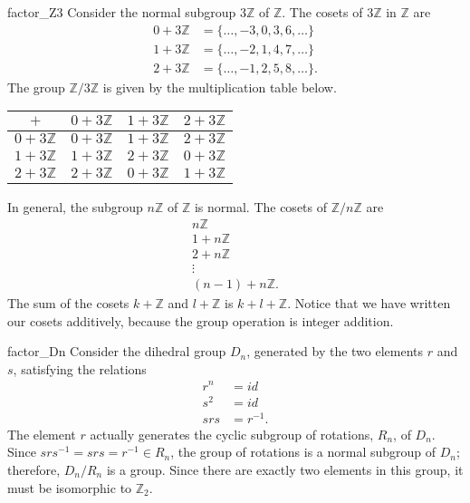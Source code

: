  
\begin{example}{factor_Z3}
Consider the normal subgroup $3 {\mathbb Z}$ of ${\mathbb Z}$. The cosets of
$3 {\mathbb Z}$ in ${\mathbb Z}$ are 
\begin{align*}
0 + 3 {\mathbb Z} & = \{ \ldots, -3, 0, 3, 6, \ldots \} \\
1 + 3 {\mathbb Z} & = \{ \ldots, -2, 1, 4, 7, \ldots \} \\
2 + 3 {\mathbb Z} & = \{ \ldots, -1, 2, 5, 8, \ldots \}.
\end{align*}
The group   ${\mathbb Z}/ 3 {\mathbb Z}$ is given by the multiplication
table below. 
\begin{center}
\begin{tabular}{c|ccc}
$+$             & $0 + 3{\mathbb Z}$ & $1 + 3{\mathbb Z}$ & $2 + 3{\mathbb Z}$ \\\hline
$0 + 3{\mathbb Z}$ & $0 + 3{\mathbb Z}$ & $1 + 3{\mathbb Z}$ & $2 + 3{\mathbb Z}$ \\
$1 + 3{\mathbb Z}$ & $1 + 3{\mathbb Z}$ & $2 + 3{\mathbb Z}$ & $0 + 3{\mathbb Z}$ \\
$2 + 3{\mathbb Z}$ & $2 + 3{\mathbb Z}$ & $0 + 3{\mathbb Z}$ & $1 + 3{\mathbb Z}$
\end{tabular}
\end{center}
In general, the subgroup $n {\mathbb Z}$ of ${\mathbb Z}$ is normal. The
cosets of ${\mathbb Z } / n {\mathbb Z}$ are 
\[
\begin{array}{c}
n {\mathbb Z} \\
1 + n {\mathbb Z} \\
2 + n {\mathbb Z} \\
\vdots \\
(n-1) + n {\mathbb Z}.
\end{array}
\]
The sum of the cosets $k + {\mathbb Z}$ and $l + {\mathbb Z}$ is $k+l + 
{\mathbb Z}$. Notice that  we have written our cosets additively, 
because the group operation is integer addition. 
\mbox{\hspace*{1in}}
\end{example}
 
 
\begin{example}{factor_Dn}
Consider the dihedral group $D_n$, generated by the two elements $r$
and $s$, satisfying the relations 
\begin{align*}
r^n & = id \\
s^2 & = id \\
srs & = r^{-1}.
\end{align*}
The element $r$ actually generates the cyclic subgroup of rotations,
$R_n$, of $D_n$.  Since $srs^{-1} = srs = r^{-1} \in R_n$, the group
of rotations is a normal subgroup of $D_n$; therefore, $D_n / R_n$ is
a group.  Since there are exactly two elements in this group, it must
be isomorphic to ${\mathbb Z}_2$.
\end{example}
 
